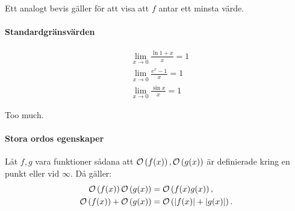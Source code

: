 Ett analogt bevis gäller för att visa att $f$ antar ett minsta värde.

\paragraph{Standardgränsvärden}
\begin{align*}
	&\lim\limits_{x\to 0}\frac{\ln{1 + x}}{x} = 1 \\
	&\lim\limits_{x\to 0}\frac{e^x - 1}{x} = 1 \\
	&\lim\limits_{x\to 0}\frac{\sin{x}}{x} = 1
\end{align*}

\proof
Too much.

\paragraph{Stora ordos egenskaper}
Låt $f, g$ vara funktioner sådana att $\mathcal{O}\left(f(x)\right), \mathcal{O}\left(g(x)\right)$ är definierade kring en punkt eller vid $\infty$. Då gäller:
\begin{align*}
	\mathcal{O}\left(f(x)\right)\mathcal{O}\left(g(x)\right)    &= \mathcal{O}\left(f(x)g(x)\right), \\
	\mathcal{O}\left(f(x)\right) + \mathcal{O}\left(g(x)\right) &= \mathcal{O}\left(\abs{f(x)} + \abs{g(x)}\right).
\end{align*}

\proof